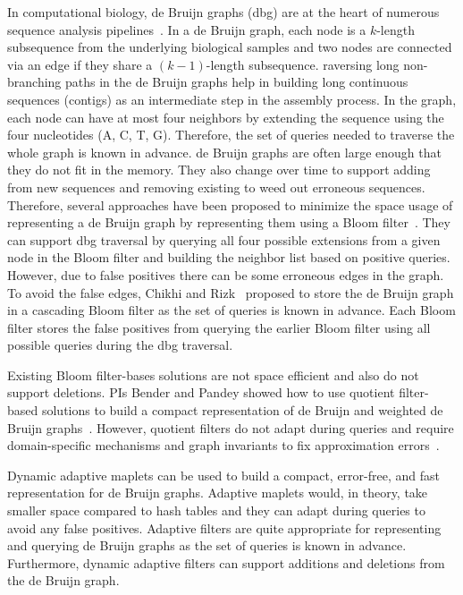   In computational biology, de Bruijn graphs (dbg) are at the heart of numerous sequence analysis pipelines~\cite{PandeyBJP17a, PandeyBJP17b}. In a de Bruijn graph, each node is a $k$-length subsequence from the underlying biological samples and two nodes are connected via an edge if they share a $(k-1)$-length subsequence.  raversing long non-branching paths in the de Bruijn graphs help in building long continuous sequences (contigs) as an intermediate step in the assembly process.
In the graph, each node can have at most four neighbors by extending the sequence using the four nucleotides (A, C, T, G). Therefore, the set of queries needed to traverse the whole graph is known in advance.
%
de Bruijn graphs are often large enough that they do not fit in the memory. They also change over time to support adding \kmers from new sequences and removing existing \kmers to weed out erroneous sequences.
Therefore, several approaches have been proposed to minimize the space usage of representing a de Bruijn graph by representing them using a Bloom filter~\cite{chikhi2013space}. They can support dbg traversal by querying all four possible extensions from a given node in the Bloom filter and building the neighbor list based on positive queries. However, due to false positives there can be some erroneous edges in the graph.
To avoid the false edges, Chikhi and Rizk~\cite{chikhi2013space} proposed to store the de Bruijn graph in a cascading Bloom filter as the set of queries is known in advance. Each Bloom filter stores the false positives from querying the earlier Bloom filter using all possible queries during the dbg traversal.

Existing Bloom filter-bases solutions are not space efficient and also do not support deletions. PIs Bender and Pandey showed how to use quotient filter-based solutions to build a compact representation of de Bruijn and weighted de Bruijn graphs~\cite{PandeyBJP17b}. However, quotient filters do not adapt during queries and require domain-specific mechanisms and graph invariants to fix approximation errors~\cite{PandeyBJP17b}.

Dynamic adaptive maplets can be used to build a compact, error-free, and fast representation for de Bruijn graphs. Adaptive maplets would, in theory, take smaller space compared to hash tables and they can adapt during queries to avoid any false positives. Adaptive filters are quite appropriate for representing and querying de Bruijn graphs as the set of queries is known in advance. Furthermore, dynamic adaptive filters can support \kmer additions and deletions from the de Bruijn graph.

